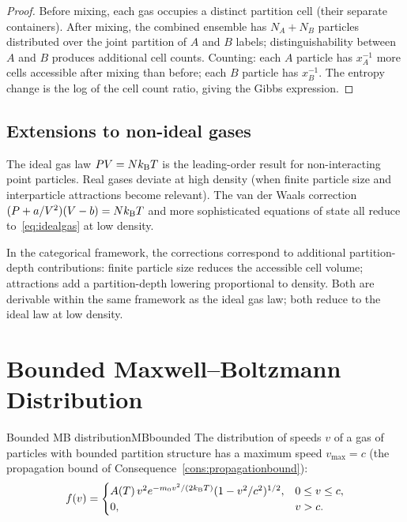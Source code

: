 \begin{proof}
Before mixing, each gas occupies a distinct partition cell (their separate containers). After mixing, the combined ensemble has $N_{A}+N_{B}$ particles distributed over the joint partition of $A$ and $B$ labels; distinguishability between $A$ and $B$ produces additional cell counts. Counting: each $A$ particle has $x_{A}^{-1}$ more cells accessible after mixing than before; each $B$ particle has $x_{B}^{-1}$. The entropy change is the log of the cell count ratio, giving the Gibbs expression.
\end{proof}

\subsection{Extensions to non-ideal gases}

The ideal gas law $PV=Nk_{\mathrm{B}} T$ is the leading-order result for non-interacting point particles. Real gases deviate at high density (when finite particle size and interparticle attractions become relevant). The van der Waals correction $(P+a/V^{2})(V-b)=Nk_{\mathrm{B}} T$ and more sophisticated equations of state all reduce to~\eqref{eq:idealgas} at low density.

In the categorical framework, the corrections correspond to additional partition-depth contributions: finite particle size reduces the accessible cell volume; attractions add a partition-depth lowering proportional to density. Both are derivable within the same framework as the ideal gas law; both reduce to the ideal law at low density.

\section{Bounded Maxwell--Boltzmann Distribution}
\label{sec:MBbounded}

\begin{consequence}{Bounded MB distribution}{MBbounded}
The distribution of speeds $v$ of a gas of particles with bounded partition structure has a maximum speed $v_{\max}=c$ (the propagation bound of Consequence~\ref{cons:propagationbound}):
\begin{equation}
f(v)=\begin{cases}A(T)\,v^{2}e^{-m_{0}v^{2}/(2k_{\mathrm{B}} T)}(1-v^{2}/c^{2})^{1/2},&0\le v\le c,\\0,&v>c.\end{cases}
\label{eq:MBbounded}
\end{equation}
\end{consequence}

